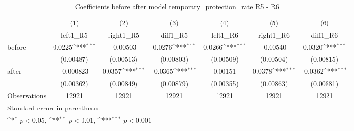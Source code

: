 \begin{table}[htbp]\centering
\def\sym#1{\ifmmode^{#1}\else\(^{#1}\)\fi}
\caption{Coefficients before after model temporary\_protection\_rate R5 - R6}
\begin{tabular}{l*{6}{c}}
\hline\hline
                    &\multicolumn{1}{c}{(1)}&\multicolumn{1}{c}{(2)}&\multicolumn{1}{c}{(3)}&\multicolumn{1}{c}{(4)}&\multicolumn{1}{c}{(5)}&\multicolumn{1}{c}{(6)}\\
                    &\multicolumn{1}{c}{left1\_R5}&\multicolumn{1}{c}{right1\_R5}&\multicolumn{1}{c}{diff1\_R5}&\multicolumn{1}{c}{left1\_R6}&\multicolumn{1}{c}{right1\_R6}&\multicolumn{1}{c}{diff1\_R6}\\
\hline
before              &      0.0225\sym{***}&    -0.00503         &      0.0276\sym{***}&      0.0266\sym{***}&    -0.00540         &      0.0320\sym{***}\\
                    &   (0.00487)         &   (0.00513)         &   (0.00803)         &   (0.00509)         &   (0.00504)         &   (0.00815)         \\
[1em]
after               &   -0.000823         &      0.0357\sym{***}&     -0.0365\sym{***}&     0.00151         &      0.0378\sym{***}&     -0.0362\sym{***}\\
                    &   (0.00362)         &   (0.00849)         &   (0.00879)         &   (0.00355)         &   (0.00863)         &   (0.00881)         \\
\hline
Observations        &       12921         &       12921         &       12921         &       12921         &       12921         &       12921         \\
\hline\hline
\multicolumn{7}{l}{\footnotesize Standard errors in parentheses}\\
\multicolumn{7}{l}{\footnotesize \sym{*} \(p<0.05\), \sym{**} \(p<0.01\), \sym{***} \(p<0.001\)}\\
\end{tabular}
\end{table}
